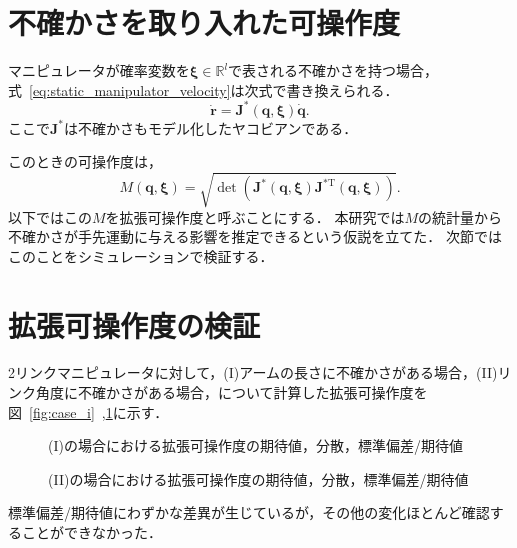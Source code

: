 \documentclass[10pt,a4j,twocolumn]{ltjsarticle}
\begin{document}
\section{不確かさを取り入れた可操作度}

マニピュレータが確率変数を$\bm{\xi} \in \mathbb{R}^{l}$で表される不確かさを持つ場合，式~\eqref{eq:static_manipulator_velocity}は次式で書き換えられる．
\begin{equation}
  \dot{\bm{r}} = \bm{J}^{*}(\bm{q}, \bm{\xi}) \dot{\bm{q}}. \label{eq:static_manipulator_velocity_with_uncertainty}
\end{equation}
ここで$\bm{J}^{*}$は不確かさもモデル化したヤコビアンである．

このときの可操作度は，
\begin{equation}
  M(\bm{q}, \bm{\xi}) = \sqrt{\det \left( \bm{J}^{*}(\bm{q}, \bm{\xi}) \bm{J}^{*\mathrm{T}}(\bm{q}, \bm{\xi}) \right)}.
\end{equation}
以下ではこの$M$を拡張可操作度と呼ぶことにする．
本研究では$M$の統計量から不確かさが手先運動に与える影響を推定できるという仮説を立てた．
次節ではこのことをシミュレーションで検証する．

\section{拡張可操作度の検証}

2リンクマニピュレータに対して，(I)アームの長さに不確かさがある場合，(II)リンク角度に不確かさがある場合，について計算した拡張可操作度を図~\ref{fig:case_i}~,\ref{fig:case_ii}に示す．
\begin{figure}
  \centering
  \caption{(I)の場合における拡張可操作度の期待値，分散，標準偏差/期待値}
  \label{fig:case_i}
  \caption{(II)の場合における拡張可操作度の期待値，分散，標準偏差/期待値}
  \label{fig:case_ii}
\end{figure}
標準偏差/期待値にわずかな差異が生じているが，その他の変化ほとんど確認することができなかった．
\end{document}
